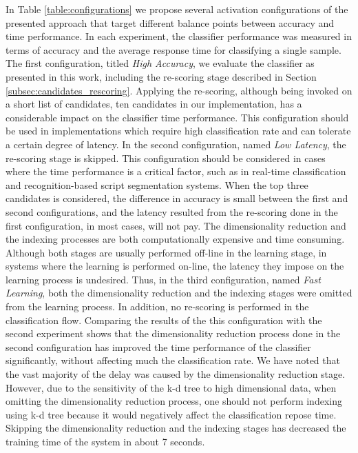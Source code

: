 \documentclass[10pt, conference, compsocconf]{IEEEtran}
\begin{document}
In Table \ref{table:configurations} we propose several activation configurations of the presented approach that target different balance points between accuracy and time performance.
In each experiment, the classifier performance was measured in terms of accuracy and the average response time for classifying a single sample.
The first configuration, titled \emph{High Accuracy}, we evaluate the classifier as presented in this work, including the re-scoring stage described in Section \ref{subsec:candidates_rescoring}.
Applying the re-scoring, although being invoked on a short list of candidates, ten candidates in our implementation, has a considerable impact on the classifier time performance. 
This configuration should be used in implementations which require high classification rate and can tolerate a certain degree of latency.
In the second configuration, named \emph{Low Latency}, the re-scoring stage is skipped.
This configuration should be considered in cases where the time performance is a critical factor, such as in real-time classification and recognition-based script segmentation systems.
When the top three candidates is considered, the difference in accuracy is small between the first and second configurations, and the latency resulted from the re-scoring done in the first configuration, in most cases, will not pay. 
The dimensionality reduction and the indexing processes are both computationally expensive and time consuming. 
Although both stages are usually performed off-line in the learning stage, in systems where the learning is performed on-line, the latency they impose on the learning process is undesired.
Thus, in the third configuration, named \emph{Fast Learning}, both the dimensionality reduction and the indexing stages were omitted from the learning process.
In addition, no re-scoring is performed in the classification flow.
Comparing the results of the this configuration with the second experiment shows that the dimensionality reduction process done in the second configuration has improved the time performance of the classifier significantly, without affecting much the classification rate.
We have noted that the vast majority of the delay was caused by the dimensionality reduction stage.
However, due to the sensitivity of the k-d tree to high dimensional data, when omitting the dimensionality reduction process, one should not perform indexing using k-d tree because it would negatively affect the classification repose time.
Skipping the dimensionality reduction and the indexing stages has decreased the training time of the system in about 7 seconds.
\end{document}
